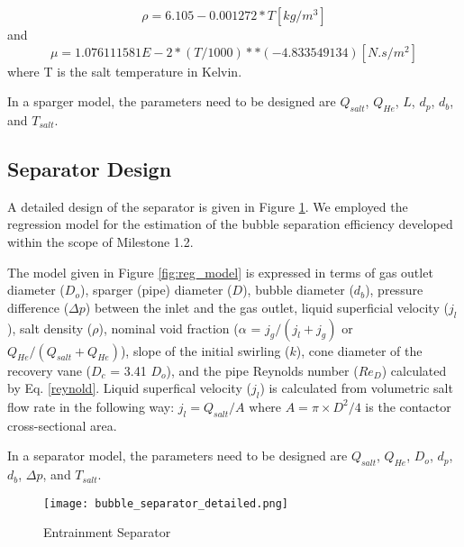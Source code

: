    \begin{equation}\label{density}
        \rho = 6.105 - 0.001272 * T [kg/m^3]
    \end{equation}
    and
    \begin{equation}\label{viscosity}
        \mu = 1.076111581E-2 * (T / 1000)**(-4.833549134) [N.s/m^2]
    \end{equation}
    where T is the salt temperature in Kelvin.

    In a sparger model, the parameters need to be designed are $Q_{salt}$, 
    $Q_{He}$, $L$, $d_p$, $d_b$, and $T_{salt}$.

\newpage
\FloatBarrier

\subsection{Separator Design}

    A detailed design of the separator is given in Figure 
    \ref{fig:bubble_sprt}. We employed the regression model for the estimation 
    of the bubble separation efficiency developed within the scope of Milestone 
    1.2.

    The model given in Figure \ref{fig:reg_model} is expressed in terms of gas 
    outlet diameter ($D_o$), sparger (pipe) diameter ($D$), bubble diameter 
    ($d_b$), pressure difference ($\Delta p$) between the inlet and the gas 
    outlet, liquid superficial velocity ($j_l$), salt density ($\rho$), nominal 
    void fraction ($\alpha$ = $j_g/(j_{l}+j_{g})$ or 
    $Q_{He}/(Q_{salt}+Q_{He})$), slope of the initial swirling ($k$), cone 
    diameter of the recovery vane ($D_c$ = 3.41 $D_o$), and the pipe Reynolds 
    number ($Re_D$) calculated by Eq. \ref{reynold}. Liquid superfical velocity 
    ($j_l$) is calculated from volumetric salt flow rate in the following way: 
    $j_l = Q_{salt}/A$ where $A = \pi\times D^2/4$ is the contactor 
    cross-sectional area.

    In a separator model, the parameters need to be designed are $Q_{salt}$, 
    $Q_{He}$, $D_o$, $d_p$, $d_b$, $\Delta p$, and $T_{salt}$.

    \begin{figure}[htbp!]
        \begin{center}
            \texttt{[image: bubble\_separator\_detailed.png]}
        \end{center}
        \caption{Entrainment Separator}
        \label{fig:bubble_sprt}
    \end{figure}

